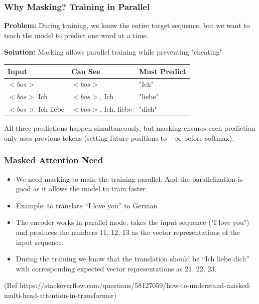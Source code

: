 \begin{frame}[fragile]\frametitle{Why Masking? Training in Parallel}

\textbf{Problem:} During training, we know the entire target sequence, but we want to teach the model to predict one word at a time.

\textbf{Solution:} Masking allows parallel training while preventing "cheating"

\begin{center}
\begin{tabular}{|l|l|l|}
\hline
\textbf{Input} & \textbf{Can See} & \textbf{Must Predict} \\
\hline
$<bos>$ & $<bos>$ & "Ich" \\
$<bos>$ Ich & $<bos>$, Ich & "liebe" \\
$<bos>$ Ich liebe & $<bos>$, Ich, liebe & "dich" \\
\hline
\end{tabular}
\end{center}

All three predictions happen simultaneously, but masking ensures each prediction only uses previous tokens (setting future positions to $-\infty$ before softmax).
\end{frame}

\begin{frame}[fragile]\frametitle{Masked Attention Need}



\begin{itemize}
  \item  We need masking to make the training parallel. And the parallelization is good as it allows the model to train faster.
  \item  Example: to translate ``I love you'' to German
  \item The encoder works in parallel mode, takes the input sequence ("I love you")  and produces the numbers 11, 12, 13 as the vector representations of the input sequence.
  \item During the training we know that the translation should be ``Ich liebe dich'' with corresponding expected vector representations as 21, 22, 23.

\end{itemize}

{\tiny (Ref https://stackoverflow.com/questions/58127059/how-to-understand-masked-multi-head-attention-in-transformer)}

\end{frame}

